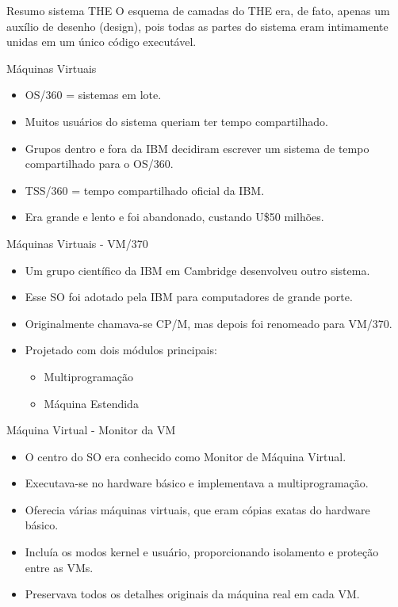 \documentclass{beamer}
\begin{document}
\begin{frame}{Resumo sistema THE}
    O esquema de camadas do THE era, de fato, apenas um auxílio de desenho (design), pois todas as partes do sistema eram intimamente unidas em um único código executável.
\end{frame}


\begin{frame}{Máquinas Virtuais}
    \begin{itemize}
        \item OS/360 = sistemas em lote.
        \item Muitos usuários do sistema queriam ter tempo compartilhado.
        \item Grupos dentro e fora da IBM decidiram escrever um sistema de tempo compartilhado para o OS/360.
        \item TSS/360 = tempo compartilhado oficial da IBM.
        \item Era grande e lento e foi abandonado, custando U\$50 milhões.
    \end{itemize}
\end{frame}
\begin{frame}{Máquinas Virtuais - VM/370}
    \begin{itemize}
        \item Um grupo científico da IBM em Cambridge desenvolveu outro sistema.
        \item Esse SO foi adotado pela IBM para computadores de grande porte.
        \item Originalmente chamava-se CP/M, mas depois foi renomeado para VM/370.
        \item Projetado com dois módulos principais:
              \begin{itemize}
                  \item Multiprogramação
                  \item Máquina Estendida
              \end{itemize}
    \end{itemize}
\end{frame}
\begin{frame}{Máquina Virtual - Monitor da VM}
    \begin{itemize}
        \item O centro do SO era conhecido como Monitor de Máquina Virtual.
        \item Executava-se no hardware básico e implementava a multiprogramação.
        \item Oferecia várias máquinas virtuais, que eram cópias exatas do hardware básico.
        \item Incluía os modos kernel e usuário, proporcionando isolamento e proteção entre as VMs.
        \item Preservava todos os detalhes originais da máquina real em cada VM.
    \end{itemize}
\end{frame}
\end{document}
